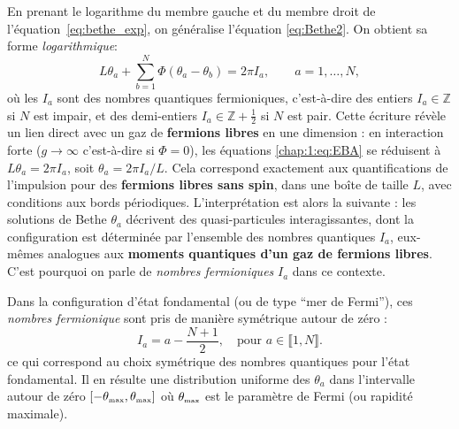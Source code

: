 En prenant le logarithme du membre gauche et du membre droit de l’équation~\eqref{eq:bethe_exp}, on généralise l'équation \eqref{eq:Bethe2}. On obtient sa forme {\em logarithmique}:
\begin{equation}\label{chap:1:eq:EBA}
	L \theta_a + \sum_{b=1}^N \Phi(\theta_a - \theta_b) = 2\pi I_a, \qquad a = 1, \dots, N,
\end{equation}
où les $I_a$ sont des nombres quantiques fermioniques, c’est-à-dire des entiers $I_a \in \mathbb{Z}$ si $N$ est impair, et des demi-entiers $I_a \in \mathbb{Z} + \tfrac{1}{2}$ si $N$ est pair.
\medskip
Cette écriture révèle un lien direct avec un gaz de {\bf fermions libres} en une dimension : en interaction forte (\ie $g \to \infty$ c’est-à-dire si $\Phi = 0$), les équations \eqref{chap:1:eq:EBA} se réduisent à $L \theta_a = 2\pi I_a$, soit $\theta_a = 2\pi I_a / L$. Cela correspond exactement aux quantifications de l'impulsion pour des {\bf fermions libres sans spin}, dans une boîte de taille $L$, avec conditions aux bords périodiques.
\medskip
L’interprétation est alors la suivante : les solutions de Bethe ${ \theta_a }$ décrivent des quasi-particules interagissantes, dont la configuration est déterminée par l’ensemble des nombres quantiques ${ I_a }$, eux-mêmes analogues aux {\bf moments quantiques d’un gaz de fermions libres}. C’est pourquoi on parle de {\em nombres fermioniques} $I_a$ dans ce contexte.

\medskip
Dans la configuration d’état fondamental (ou de type “mer de Fermi”), ces {\em nombres fermionique} sont pris de manière symétrique autour de zéro :
\begin{equation}
	I_a = a - \frac{N+1}{2}, \quad \text{pour } a \in \llbracket 1 , N \rrbracket.
\end{equation}
ce qui correspond au choix symétrique des nombres quantiques pour l’état fondamental. Il en résulte une distribution uniforme des $\theta_a$ dans l’intervalle autour de zéro $[-\theta_{\mbox{\tiny max}} , \theta_{\mbox{\tiny max}} ]$ où \( \theta_{\mbox{\tiny max}} \) est le paramètre de Fermi (ou rapidité maximale).

